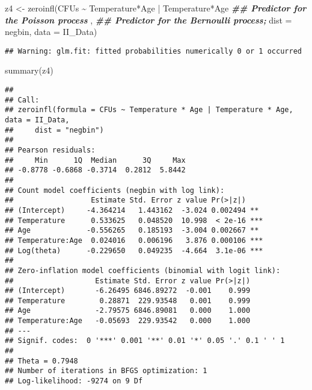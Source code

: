 \documentclass[
]{article}
\newenvironment{Shaded}{\begin{snugshade}}{\end{snugshade}}
\newcommand{\AttributeTok}[1]{\textcolor[rgb]{0.77,0.63,0.00}{#1}}
\newcommand{\DocumentationTok}[1]{\textcolor[rgb]{0.56,0.35,0.01}{\textbf{\textit{#1}}}}
\newcommand{\FunctionTok}[1]{\textcolor[rgb]{0.00,0.00,0.00}{#1}}
\newcommand{\NormalTok}[1]{#1}
\newcommand{\OtherTok}[1]{\textcolor[rgb]{0.56,0.35,0.01}{#1}}
\newcommand{\SpecialCharTok}[1]{\textcolor[rgb]{0.00,0.00,0.00}{#1}}
\newcommand{\StringTok}[1]{\textcolor[rgb]{0.31,0.60,0.02}{#1}}
\begin{document}
\begin{Shaded}
\begin{Highlighting}[]
\NormalTok{z4 }\OtherTok{\textless{}{-}} \FunctionTok{zeroinfl}\NormalTok{(CFUs }\SpecialCharTok{\textasciitilde{}}\NormalTok{ Temperature}\SpecialCharTok{*}\NormalTok{Age }\SpecialCharTok{|}\NormalTok{ Temperature}\SpecialCharTok{*}\NormalTok{Age }\DocumentationTok{\#\# Predictor for the Poisson process}
\NormalTok{               , }\DocumentationTok{\#\# Predictor for the Bernoulli process;}
               \AttributeTok{dist =} \StringTok{\textquotesingle{}negbin\textquotesingle{}}\NormalTok{,}
               \AttributeTok{data =}\NormalTok{ II\_Data)}
\end{Highlighting}
\end{Shaded}

\begin{verbatim}
## Warning: glm.fit: fitted probabilities numerically 0 or 1 occurred
\end{verbatim}

\begin{Shaded}
\begin{Highlighting}[]
\FunctionTok{summary}\NormalTok{(z4)}
\end{Highlighting}
\end{Shaded}

\begin{verbatim}
## 
## Call:
## zeroinfl(formula = CFUs ~ Temperature * Age | Temperature * Age, data = II_Data, 
##     dist = "negbin")
## 
## Pearson residuals:
##     Min      1Q  Median      3Q     Max 
## -0.8778 -0.6868 -0.3714  0.2812  5.8442 
## 
## Count model coefficients (negbin with log link):
##                  Estimate Std. Error z value Pr(>|z|)    
## (Intercept)     -4.364214   1.443162  -3.024 0.002494 ** 
## Temperature      0.533625   0.048520  10.998  < 2e-16 ***
## Age             -0.556265   0.185193  -3.004 0.002667 ** 
## Temperature:Age  0.024016   0.006196   3.876 0.000106 ***
## Log(theta)      -0.229650   0.049235  -4.664  3.1e-06 ***
## 
## Zero-inflation model coefficients (binomial with logit link):
##                   Estimate Std. Error z value Pr(>|z|)
## (Intercept)       -6.26495 6846.89272  -0.001    0.999
## Temperature        0.28871  229.93548   0.001    0.999
## Age               -2.79575 6846.89081   0.000    1.000
## Temperature:Age   -0.05693  229.93542   0.000    1.000
## ---
## Signif. codes:  0 '***' 0.001 '**' 0.01 '*' 0.05 '.' 0.1 ' ' 1 
## 
## Theta = 0.7948 
## Number of iterations in BFGS optimization: 1 
## Log-likelihood: -9274 on 9 Df
\end{verbatim}
\end{document}
